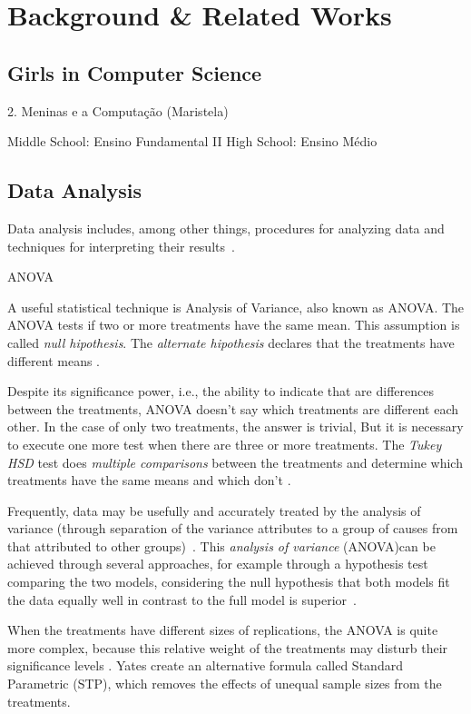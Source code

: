 \section{Background \& Related Works}\label{sec:background}%

\subsection{Girls in Computer Science}\label{subsec:background:girls}%
2. Meninas e a Computação (Maristela)

Middle School: Ensino Fundamental II
High School: Ensino Médio

\subsection{Data Analysis}\label{subsec:background:data}%

Data analysis includes, among other things, procedures for analyzing data and techniques for interpreting their results~\cite{Tukey1962}.

%
ANOVA ~\cite{Hastie2009}

A useful statistical technique is Analysis of Variance, also known as ANOVA. The ANOVA tests if two or more treatments have the same mean. This assumption is called \emph{null hipothesis}. The \emph{alternate hipothesis} declares that the treatments have different means \cite{Vieira2006}.

Despite its significance power, i.e., the ability to indicate that are differences between the treatments, ANOVA doesn't say which treatments are different each other. In the case of only two treatments, the answer is trivial, But it is necessary to execute one more test when there are three or more treatments. The \emph{Tukey HSD} test does \emph{multiple comparisons} between the treatments and determine which treatments have the same means and which don't \cite{moore2009practice}.

Frequently, data may be usefully and accurately treated by the analysis of variance (through separation of the variance attributes to a group of causes from that attributed to other groups)~\cite{Fisher1934}. This \emph{analysis of variance} (ANOVA)can be achieved through several approaches, for example through a hypothesis test comparing the two models, considering the null hypothesis that both models fit the data equally well in contrast to  the full model is superior~\cite{James2013}.

When the treatments have different sizes of replications, the ANOVA is quite more complex\cite{ott2008introduction}, because this relative weight of the treatments may disturb their significance levels \cite{schuessler1971analyzing}. Yates \cite{herr_history_1986} create an alternative formula called Standard Parametric (STP), which removes the effects of unequal sample sizes from the treatments.

%

